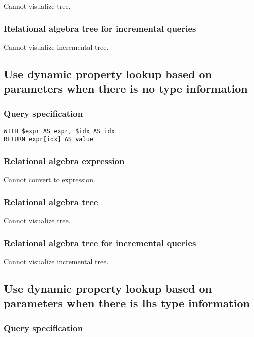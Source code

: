 Cannot visualize tree.

\subsubsection*{Relational algebra tree for incremental queries}

Cannot visualize incremental tree.

\subsection{Use dynamic property lookup based on parameters when there is no type information}

\subsubsection*{Query specification}

\begin{lstlisting}
WITH $expr AS expr, $idx AS idx
RETURN expr[idx] AS value
\end{lstlisting}

\subsubsection*{Relational algebra expression}

Cannot convert to expression.

\subsubsection*{Relational algebra tree}

Cannot visualize tree.

\subsubsection*{Relational algebra tree for incremental queries}

Cannot visualize incremental tree.

\subsection{Use dynamic property lookup based on parameters when there is lhs type information}

\subsubsection*{Query specification}

